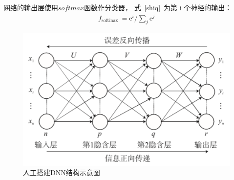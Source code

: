 \documentclass{whutmod}
\begin{document}
	网络的输出层使用$ softmax $函数作分类器， 式~\ref{shiq}~为第 i 个神经的输出：
	\begin{gather}\label{shiq}
		f_{\text {softinax }}=\mathrm{e}^{i} / \sum_{j} \mathrm{e}^{j}
	\end{gather}
	
		\begin{figure}[H]
		\centering
		\includegraphics[width=\textwidth]{figures/123546.png}
		\caption{人工搭建DNN结构示意图}\label{dnn}
	\end{figure}
	
	
\end{document}
